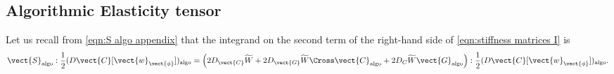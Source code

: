 \subsection{Algorithmic Elasticity tensor}\label{sec:elasticity tensor}

Let us recall from \eqref{eqn:S algo appendix} that the integrand on the second term of the right-hand side of \eqref{eqn:stiffness matrices I} is
%
\begin{equation}\label{eqn:S algo appendix}
\vect{S}_{\text{algo}}:\frac{1}{2}(D\vect{C}[\vect{w}_{\vect{\phi}}])_{\text{algo}}=\left(2D_{\vect{C}}\widetilde{W} + 2D_{\vect{G}}\widetilde{W}\Cross\vect{C}_{\text{algo}} + 2D_{C}\widetilde{W}\vect{G}_{\text{algo}}\right):\frac{1}{2}(D\vect{C}[\vect{w}_{\vect{\phi}}])_{\text{algo}}.
\end{equation}


